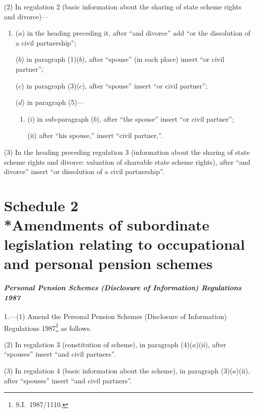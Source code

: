 \documentclass[12pt,a4paper]{article}
\begin{document}
(2) In regulation 2 (basic information about the sharing of state scheme rights and divorce)—
\begin{enumerate}\item[]
($a$) in the heading preceding it, after “and divorce” add “or the dissolution of a civil partnership”;

($b$) in paragraph (1)($b$), after “spouse” (in each place) insert “or civil partner”;

($c$) in paragraph (3)($c$), after “spouse” insert “or civil partner”;

($d$) in paragraph (5)—
\begin{enumerate}\item[]
(i) in sub-paragraph ($b$), after “the spouse” insert “or civil partner”;

(ii) after “his spouse,” insert “civil partner,”.
\end{enumerate}
\end{enumerate}

(3) In the heading preceding regulation 3 (information about the sharing of state scheme rights and divorce: valuation of shareable state scheme rights), after “and divorce” insert “or dissolution of a civil partnership”.

\part[Schedule 2 --- Amendments of subordinate legislation relating to occupational and personal pension schemes]{Schedule 2\\*Amendments of subordinate legislation relating to occupational and personal pension schemes}

\renewcommand\parthead{--- Schedule 2}

\subsection*{\itshape\sloppy Personal Pension Schemes (Disclosure of Information) Regulations 1987}

1.---(1)  Amend the Personal Pension Schemes (Disclosure of Information) Regulations 1987\footnote{S.I.\ 1987/1110.} as follows.

(2) In regulation 3 (constitution of scheme), in paragraph (4)($a$)(ii), after “spouses” insert “and civil partners”.

(3) In regulation 4 (basic information about the scheme), in paragraph (3)($a$)(ii), after “spouses” insert “and civil partners”.
\end{document}
